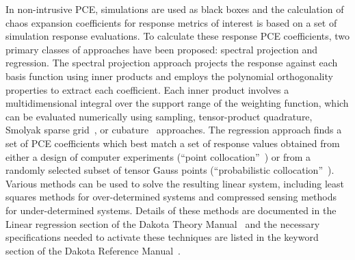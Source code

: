In non-intrusive PCE, simulations are used as black boxes and the
calculation of chaos expansion coefficients for response metrics of
interest is based on a set of simulation response evaluations. To
calculate these response PCE coefficients, two primary classes of
approaches have been proposed: spectral projection and regression. The
spectral projection approach projects the response against each basis
function using inner products and employs the polynomial orthogonality
properties to extract each coefficient. Each inner product involves a
multidimensional integral over the support range of the weighting
function, which can be evaluated numerically using sampling,
tensor-product quadrature, Smolyak sparse grid~\cite{Smolyak_63}, or
cubature~\cite{stroud} approaches. The regression approach finds a set
of PCE coefficients which best match a set of response values obtained
from either a design of computer experiments (``point
collocation''~\cite{pt_colloc1}) or from a randomly selected subset of
tensor Gauss points (``probabilistic
collocation''~\cite{Tat95}). Various methods can be used to solve the
resulting linear system, including least squares methods for
over-determined systems and compressed sensing methods for
under-determined systems. Details of these methods are documented in
the Linear regression section of the Dakota Theory
Manual~\cite{TheoMan} and the necessary specifications needed to
activate these techniques are listed in the keyword section of the
Dakota Reference Manual~\cite{RefMan}.

